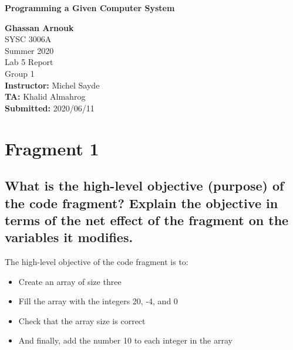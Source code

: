 \documentclass{article}
\begin{document}
	\begin{titlepage}
		\begin{center}
			\vspace{1cm}
			{\LARGE\textbf{Programming a Given Computer System}}

			\vspace{1.5cm}
			\textbf{\large Ghassan Arnouk}\\
			
			\vspace{1cm}
			\large SYSC 3006A\\
			\large Summer 2020\\
			\large Lab 5 Report\\
			\large Group 1\\
			
						
			\vspace{2cm}
			\textbf{Instructor:} Michel Sayde\\
			
			\vspace{0.1cm}
			\textbf{TA:} Khalid Almahrog\\
			
			\vspace{0.1cm}
			\textbf{Submitted:} 2020/06/11\\			
		\end{center}
	\end{titlepage}
	
	\pagebreak
	
	\section{Fragment 1}
	\subsection{What is the high-level objective (purpose) of the code fragment? Explain the objective in terms of the net effect of the fragment on the variables it modifies.}
	The high-level objective of the code fragment is to:
	\begin{itemize}
		\item Create an array of size three
		\item Fill the array with the integers 20, -4, and 0
		\item Check that the array size is correct
		\item And finally, add the number 10 to each integer in the array
	\end{itemize}
	
\end{document}
